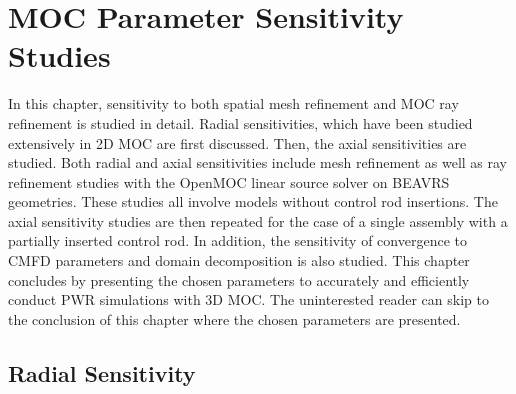 \chapter{MOC Parameter Sensitivity Studies}
\label{chap:moc-sensitivity}

In this chapter, sensitivity to both spatial mesh refinement and \ac{MOC} ray refinement is studied in detail. Radial sensitivities, which have been studied extensively in 2D \ac{MOC} are first discussed. Then, the axial sensitivities are studied. Both radial and axial sensitivities include mesh refinement as well as ray refinement studies with the OpenMOC linear source solver on BEAVRS geometries. These studies all involve models without control rod insertions. The axial sensitivity studies are then repeated for the case of a single assembly with a partially inserted control rod. In addition, the sensitivity of convergence to \ac{CMFD} parameters and domain decomposition is also studied. This chapter concludes by presenting the chosen parameters to accurately and efficiently conduct \ac{PWR} simulations with 3D \ac{MOC}. The uninterested reader can skip to the conclusion of this chapter where the chosen parameters are presented.


\section{Radial Sensitivity}
\label{sec:radial-sensitivity}

